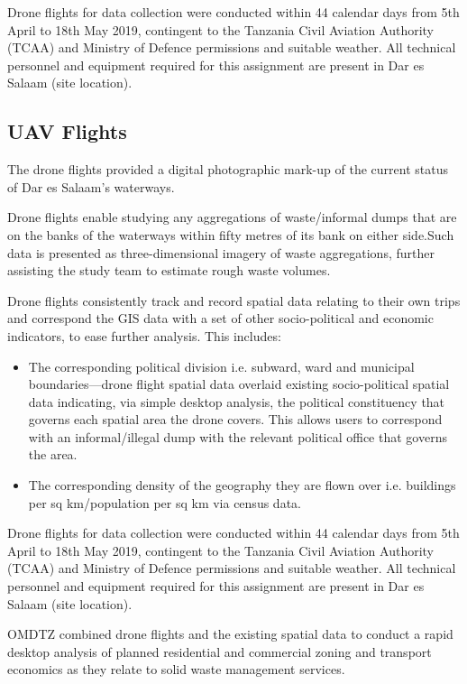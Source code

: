 \documentclass[a4paper,12pt,twoside]{article}
\begin{document}
    Drone flights for data collection were conducted within 44 calendar days from 5th April to 18th May 2019, contingent to the Tanzania Civil Aviation Authority (TCAA) and Ministry of Defence permissions and suitable weather. All technical personnel and equipment required for this assignment are present in Dar es Salaam (site location). 

\subsection{UAV Flights}
    The drone flights provided a digital photographic mark-up of the current status of Dar es Salaam’s waterways. 
    
    Drone flights enable studying any aggregations of waste/informal dumps that are on the banks of the waterways within fifty metres of its bank on either side.Such data is presented as three-dimensional imagery of waste aggregations, further assisting the study team to estimate rough waste volumes.  

    Drone flights consistently track and record spatial data relating to their own trips and correspond the GIS data with a set of other socio-political and economic indicators, to ease further analysis. This includes:
    \begin{itemize}
        \item The corresponding political division i.e. subward, ward and municipal boundaries—drone flight spatial data overlaid existing socio-political spatial data indicating, via simple desktop analysis, the political constituency that governs each spatial area the drone covers. This allows users to correspond with an informal/illegal dump with the relevant political office that governs the area.
        \item The corresponding density of the geography they are flown over i.e. buildings per sq km/population per sq km via census data.
    \end{itemize}  

    Drone flights for data collection were conducted within 44 calendar days from 5th April to 18th May 2019, contingent  to the Tanzania Civil Aviation Authority (TCAA) and Ministry of Defence permissions and suitable weather. All technical personnel and equipment required for this assignment are present in Dar es Salaam (site location).
    
    OMDTZ  combined drone flights and the existing spatial data to conduct a rapid desktop analysis of planned residential and commercial zoning and transport economics as they relate to solid waste management services. 
\end{document}
